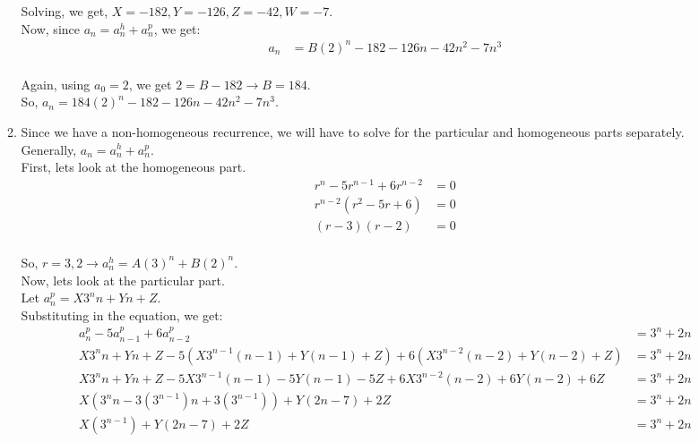 \documentclass[a4paper]{article}
\begin{document}
\begin{enumerate}
\begin{enumerate}
            Solving, we get, $X = -182, Y = -126, Z = -42, W = -7$. \\

            Now, since $a_n = a^h_n + a^p_n$, we get:
            \[
                \begin{split}
                    a_n &= B(2)^n - 182 - 126n - 42n^2 - 7n^3 \\
                \end{split}
            \]

            Again, using $a_0 = 2$, we get $2 = B - 182 \rightarrow B = 184$. \\

            So, $a_n = 184(2)^n - 182 - 126n - 42n^2 - 7n^3$. \\

            \newpage
            \item Since we have a non-homogeneous recurrence, we will have to solve for the particular and homogeneous parts separately. \\
            
            Generally, $a_n = a^h_n + a^p_n$. \\

            First, lets look at the homogeneous part. \\
            \[
                \begin{split}
                    r^n - 5r^{n-1} + 6r^{n-2} &= 0 \\
                    r^{n-2}(r^2 - 5r + 6) &= 0 \\
                    (r - 3)(r - 2) &= 0 \\
                \end{split}
            \]

            So, $r = 3, 2 \rightarrow a^h_n = A(3)^n + B(2)^n$. \\

            Now, lets look at the particular part. \\
            Let $a^p_n = X3^nn + Yn + Z$. \\

            Substituting in the equation, we get:
            \[
                \begin{split}
                    a^p_n - 5a^p_{n-1} + 6a^p_{n-2} &= 3^n + 2n \\
                    X3^nn + Yn + Z - 5(X3^{n-1}(n-1) + Y(n-1) + Z) + 6(X3^{n-2}(n-2) + Y(n-2) + Z) &= 3^n + 2n \\
                    X3^nn + Yn + Z - 5X3^{n-1}(n-1) - 5Y(n-1) - 5Z + 6X3^{n-2}(n-2) + 6Y(n-2) + 6Z &= 3^n + 2n \\
                    X(3^nn - 3(3^{n-1})n + 3(3^{n-1})) + Y(2n - 7) + 2Z &= 3^n + 2n \\
                    X(3^{n-1}) + Y(2n - 7) + 2Z &= 3^n + 2n \\
                \end{split}
            \]


\end{enumerate}
\end{enumerate}
\end{document}
